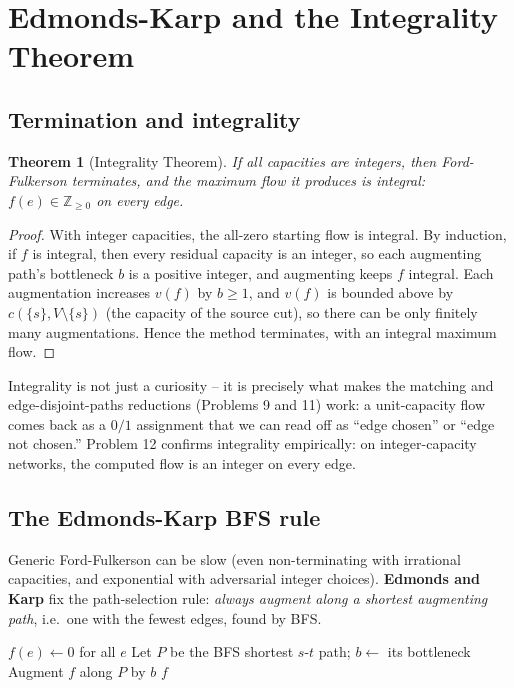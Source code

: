 \documentclass[11pt]{article}
\newtheorem{theorem}{Theorem}[section]
\begin{document}
\section{Edmonds-Karp and the Integrality Theorem}
\label{sec:edmonds-karp}

\subsection{Termination and integrality}

\begin{theorem}[Integrality Theorem]
\label{thm:integrality}
If all capacities are integers, then Ford-Fulkerson terminates, and the maximum flow it
produces is \emph{integral}: $f(e) \in \mathbb{Z}_{\ge 0}$ on every edge.
\end{theorem}

\begin{proof}
With integer capacities, the all-zero starting flow is integral. By induction, if $f$ is
integral, then every residual capacity is an integer, so each augmenting path's bottleneck
$b$ is a positive integer, and augmenting keeps $f$ integral. Each augmentation increases
$v(f)$ by $b \ge 1$, and $v(f)$ is bounded above by $c(\{s\}, V\setminus\{s\})$ (the
capacity of the source cut), so there can be only finitely many augmentations. Hence the
method terminates, with an integral maximum flow.
\end{proof}

Integrality is not just a curiosity -- it is precisely what makes the matching and
edge-disjoint-paths reductions (Problems 9 and 11) work: a unit-capacity flow comes back
as a $0/1$ assignment that we can read off as ``edge chosen'' or ``edge not chosen.''
Problem 12 confirms integrality empirically: on integer-capacity networks, the computed
flow is an integer on every edge.

\subsection{The Edmonds-Karp BFS rule}

Generic Ford-Fulkerson can be slow (even non-terminating with irrational capacities, and
exponential with adversarial integer choices). \textbf{Edmonds and Karp} fix the
path-selection rule: \emph{always augment along a shortest augmenting path}, i.e.\ one with
the fewest edges, found by BFS.

\begin{algorithm}[h]
\caption{Edmonds-Karp (BFS augmenting paths)}
\begin{algorithmic}[1]
\State $f(e) \gets 0$ for all $e$
    \State Let $P$ be the BFS shortest $s$-$t$ path; $b \gets$ its bottleneck
    \State Augment $f$ along $P$ by $b$
\EndWhile
\State \Return $f$
\end{algorithmic}
\end{algorithm}
\end{document}
